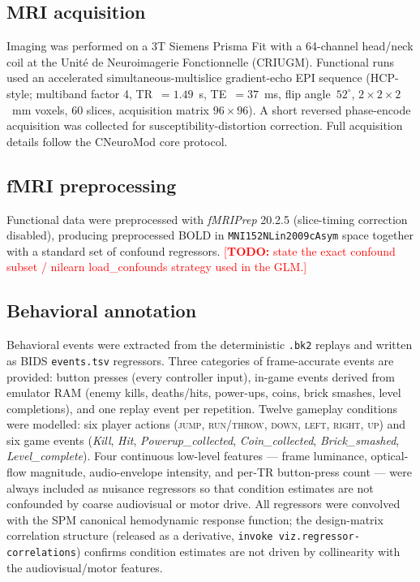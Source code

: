 \documentclass{article}
\newcommand{\TODO}[1]{\textcolor{red}{[\textbf{TODO:} #1]}}
\begin{document}
\subsection*{MRI acquisition}
Imaging was performed on a 3T Siemens Prisma Fit with a 64-channel head/neck coil at the Unité
de Neuroimagerie Fonctionnelle (CRIUGM). Functional runs used an accelerated
simultaneous-multislice gradient-echo EPI sequence (HCP-style; multiband factor 4,
TR~$=1.49$~s, TE~$=37$~ms, flip angle~$52^\circ$, $2\times2\times2$~mm voxels, 60 slices,
acquisition matrix $96\times96$)\cite{xu2013multiband,glasser2016hcp}. A short reversed
phase-encode acquisition was collected for susceptibility-distortion correction. Full
acquisition details follow the CNeuroMod core protocol\cite{cneuromod2025}.

\subsection*{fMRI preprocessing}
Functional data were preprocessed with \textit{fMRIPrep} 20.2.5\cite{esteban2019fmriprep}
(slice-timing correction disabled), producing preprocessed BOLD in
\texttt{MNI152NLin2009cAsym} space together with a standard set of confound regressors.
\TODO{state the exact confound subset / nilearn load\_confounds strategy used in the GLM.}

\subsection*{Behavioral annotation}
Behavioral events were extracted from the deterministic \texttt{.bk2} replays and written as
BIDS \texttt{events.tsv} regressors. Three categories of frame-accurate events are provided:
button presses (every controller input), in-game events derived from emulator RAM (enemy kills,
deaths/hits, power-ups, coins, brick smashes, level completions), and one replay event per
repetition. Twelve gameplay conditions were modelled: six player actions (\textsc{jump},
\textsc{run/throw}, \textsc{down}, \textsc{left}, \textsc{right}, \textsc{up}) and six game
events (\textit{Kill}, \textit{Hit}, \textit{Powerup\_collected}, \textit{Coin\_collected},
\textit{Brick\_smashed}, \textit{Level\_complete}). Four continuous low-level features — frame
luminance, optical-flow magnitude, audio-envelope intensity, and per-TR button-press count —
were always included as nuisance regressors so that condition estimates are not confounded by
coarse audiovisual or motor drive. All regressors were convolved with the SPM canonical
hemodynamic response function; the design-matrix correlation structure (released as a derivative,
\texttt{invoke viz.regressor-correlations}) confirms condition estimates are not driven by
collinearity with the audiovisual/motor features.
\end{document}
